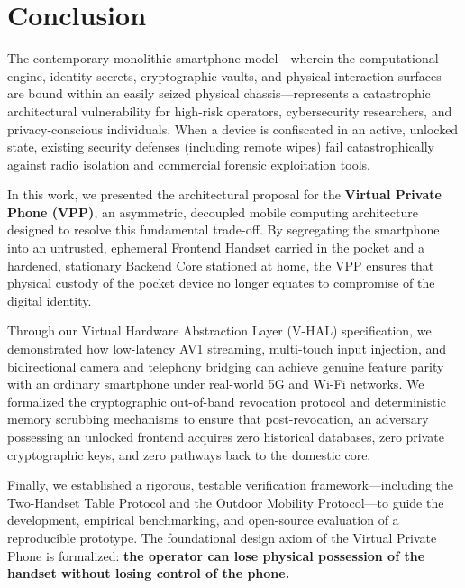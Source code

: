 \section{Conclusion}
\label{sec:conclusion}

The contemporary monolithic smartphone model—wherein the computational engine, identity secrets, cryptographic vaults, and physical interaction surfaces are bound within an easily seized physical chassis—represents a catastrophic architectural vulnerability for high-risk operators, cybersecurity researchers, and privacy-conscious individuals. When a device is confiscated in an active, unlocked state, existing security defenses (including remote wipes) fail catastrophically against radio isolation and commercial forensic exploitation tools.

In this work, we presented the architectural proposal for the \textbf{Virtual Private Phone (VPP)}, an asymmetric, decoupled mobile computing architecture designed to resolve this fundamental trade-off. By segregating the smartphone into an untrusted, ephemeral Frontend Handset carried in the pocket and a hardened, stationary Backend Core stationed at home, the VPP ensures that physical custody of the pocket device no longer equates to compromise of the digital identity.

Through our Virtual Hardware Abstraction Layer (V-HAL) specification, we demonstrated how low-latency AV1 streaming, multi-touch input injection, and bidirectional camera and telephony bridging can achieve genuine feature parity with an ordinary smartphone under real-world 5G and Wi-Fi networks. We formalized the cryptographic out-of-band revocation protocol and deterministic memory scrubbing mechanisms to ensure that post-revocation, an adversary possessing an unlocked frontend acquires zero historical databases, zero private cryptographic keys, and zero pathways back to the domestic core.

Finally, we established a rigorous, testable verification framework—including the Two-Handset Table Protocol and the Outdoor Mobility Protocol—to guide the development, empirical benchmarking, and open-source evaluation of a reproducible prototype. The foundational design axiom of the Virtual Private Phone is formalized: \textbf{the operator can lose physical possession of the handset without losing control of the phone.}
